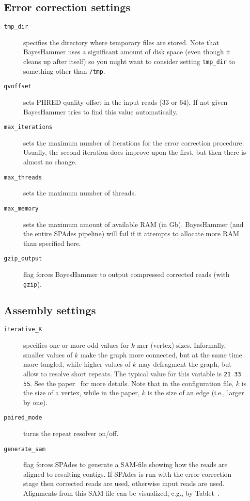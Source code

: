 \documentclass{article}
\def\spades{SPAdes}
\def\bh{BayesHammer}
\begin{document}
\subsection{Error correction settings}
\begin{description}
\item[{\tt tmp\_dir}] specifies the directory where temporary files are stored. Note that {\bh} uses a significant amount of disk space (even though it
cleans up after itself) so you might want to consider setting {\tt tmp\_dir} to something other than {\tt /tmp}.
\item[{\tt qvoffset}] sets PHRED quality offset in the input reads ($33$ or $64$). If not given {\bh} tries to find this value automatically.
\item[{\tt max\_iterations}] sets the maximum number of iterations
for the error correction procedure. Usually, the second iteration does improve upon the first, but then there is almost no change.
\item[{\tt max\_threads}] sets the maximum number of threads.
\item[{\tt max\_memory}] sets the maximum amount of available RAM (in Gb). {\bh} (and the entire {\spades} pipeline) will fail if it attempts
to allocate more RAM than specified here.
\item[{\tt gzip\_output}] flag forces {\bh} to output compressed corrected reads (with {\tt gzip}).
\end{description}

\subsection{Assembly settings}\label{subsec:assembly}
\begin{description}
\item[{\tt iterative\_K}] specifies one or more odd values for $k$-mer (vertex) sizes.  Informally, smaller values of $k$ make the graph more connected, but at the same time more tangled, while higher values of $k$ may defragment the graph, but allow to resolve short repeats. The typical value for this variable is {\tt 21 33 55}. See the paper~\cite{main} for more details.  Note that in the configuration file, $k$ is the size of a vertex, while in the paper, $k$ is the size of an edge (i.e.,
larger by one).

\item[{\tt paired\_mode}] turns the repeat resolver on/off.

\item[{\tt generate\_sam}] flag forces {\spades} to generate a SAM-file
showing how the reads are aligned to resulting contigs. If {\spades}
is run with the error correction stage then corrected reads are used,
otherwise input reads are used. Alignments from this SAM-file
can be visualized, e.g., by Tablet~\cite{tablet}.
\end{description}
\end{document}
